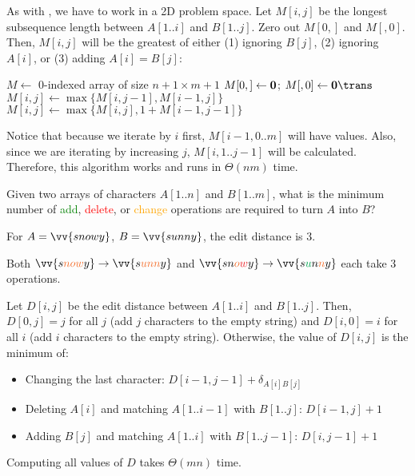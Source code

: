 As with , we have to work in a 2D problem space.
Let $M[i,j]$ be the longest subsequence length between $A[1..i]$ and $B[1..j]$.
Zero out $M[0,]$ and $M[,0]$.
Then, $M[i,j]$ will be the greatest of either
(1) ignoring $B[j]$, (2) ignoring $A[i]$, or (3) adding $A[i] = B[j]$:

\begin{algorithm}
  \caption{}
  \begin{algorithmic}[1]
    \State $M \gets$ 0-indexed array of size $n+1 \times m+1$
    \State $M[0,] \gets \vb{0}$; $M[,0] \gets \vb{0}\trans$
        \State $M[i,j] \gets \max\{M[i,j-1], M[i-1,j]\}$
          \State $M[i,j] \gets \max\{M[i,j], 1 + M[i-1,j-1]\}$
        \EndIf
      \EndFor
    \EndFor
    \State {}
  \end{algorithmic}
\end{algorithm}

Notice that because we iterate by $i$ first, $M[i-1,0..m]$ will have values.
Also, since we are iterating by increasing $j$, $M[i,1..j-1]$ will be calculated.
Therefore, this algorithm works and runs in $\Theta(nm)$ time.

\begin{problem}
  Given two arrays of characters $A[1..n]$ and $B[1..m]$,
  what is the minimum number of
  \textcolor{Green}{add}, \textcolor{Red}{delete}, or \textcolor{Orange}{change}
  operations are required to turn $A$ into $B$?
\end{problem}

\begin{example}
  For $A = \vv{snowy}$, $B = \vv{sunny}$, the edit distance is 3.

  Both $\vv{s{\color{Orange}now}y} \to \vv{s{\color{Orange}unn}y}$ and
  $\vv{sn{\color{Orange}o}{\color{Red}w}y} \to \vv{s{\color{Green}u}n{\color{Orange}n}y}$
  each take 3 operations.
\end{example}

Let $D[i,j]$ be the edit distance between $A[1..i]$ and $B[1..j]$.
Then, $D[0,j] = j$ for all $j$ (add $j$ characters to the empty string)
and $D[i,0] = i$ for all $i$ (add $i$ characters to the empty string).
Otherwise, the value of $D[i,j]$ is the minimum of:
\begin{itemize}[nosep]
  \item Changing the last character: $D[i-1,j-1] + \delta_{A[i]B[j]}$
  \item Deleting $A[i]$ and matching $A[1..i-1]$ with $B[1..j]$: $D[i-1,j]+1$
  \item Adding $B[j]$ and matching $A[1..i]$ with $B[1..j-1]$: $D[i,j-1]+1$
\end{itemize}
Computing all values of $D$ takes $\Theta(mn)$ time.

